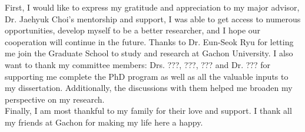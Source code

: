 
\begin{acknowledgements}       
First, I would like to express my gratitude and appreciation to my major advisor, Dr. Jaehyuk Choi’s mentorship and support, I was able to get access to numerous opportunities, develop myself to be a better researcher, and I hope our cooperation will continue in the future. Thanks to Dr. Eun-Seok Ryu for letting me join the Graduate School to study and research at Gachon University. I also want to thank my committee members: Drs. ???, ???, ???
and Dr. ??? for supporting me complete the PhD program as well as all the valuable inputs to my dissertation. Additionally, the discussions with them helped me broaden my perspective on my research.\\
Finally, I am most thankful to my family for their love and support. I thank all my friends at Gachon for making my life here a happy.
\end{acknowledgements}
